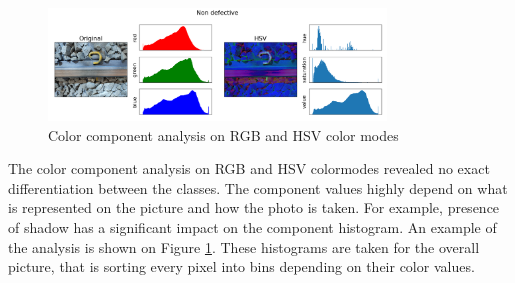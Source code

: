 \documentclass[10pt, final]{article}
\begin{document}
\begin{figure}[!ht]
	\centering
	\includegraphics[width=0.8\textwidth]{./tex_graphs/comp_analysis_1.png}
	\caption{Color component analysis on RGB and HSV color modes}
	\label{fig:color_analysis}
\end{figure}

The color component analysis on RGB and HSV colormodes revealed no exact differentiation between the classes.
The component values highly depend on what is represented on the picture and how the photo is taken.
For example, presence of shadow has a significant impact on the component histogram.
An example of the analysis is shown on Figure \ref{fig:color_analysis}.
These histograms are taken for the overall picture, that is sorting every pixel into bins depending on their color values.
\end{document}
